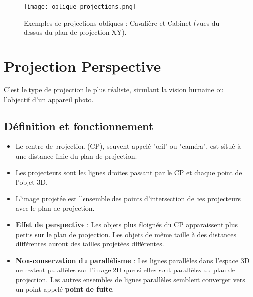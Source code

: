 \begin{figure}[H]
\centering
\texttt{[image: oblique\_projections.png]}
\caption{Exemples de projections obliques : Cavalière et Cabinet (vues du dessus du plan de projection XY).}
\label{fig:oblique_projections}
\end{figure}
\section{Projection Perspective}
C'est le type de projection le plus réaliste, simulant la vision humaine ou l'objectif d'un appareil photo.
\subsection{Définition et fonctionnement}
\begin{itemize}
    \item Le centre de projection (CP), souvent appelé "œil" ou "caméra", est situé à une distance finie du plan de projection.
    \item Les projecteurs sont les lignes droites passant par le CP et chaque point de l'objet 3D.
    \item L'image projetée est l'ensemble des points d'intersection de ces projecteurs avec le plan de projection.
    \item \textbf{Effet de perspective} : Les objets plus éloignés du CP apparaissent plus petits sur le plan de projection. Les objets de même taille à des distances différentes auront des tailles projetées différentes.
    \item \textbf{Non-conservation du parallélisme} : Les lignes parallèles dans l'espace 3D ne restent parallèles sur l'image 2D que si elles sont parallèles au plan de projection. Les autres ensembles de lignes parallèles semblent converger vers un point appelé \textbf{point de fuite}.
\end{itemize}
